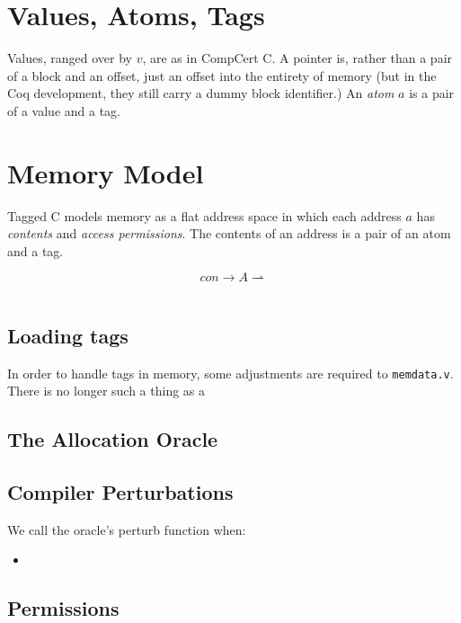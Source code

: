 \documentclass{article}
\begin{document}
\section{Values, Atoms, Tags}

Values, ranged over by \(v\), are as in CompCert C. A pointer is, rather than a pair of
a block and an offset, just an offset into the entirety of memory
(but in the Coq development, they still carry a dummy block identifier.)
An {\it atom} \(a\) is a pair of a value and a tag.

\section{Memory Model}

Tagged C models memory as a flat address space in which each address \(a\)
has {\it contents} and {\it access permissions}. The contents of an address
is a pair of an atom and a tag.

\[\mathit{con} \rightarrow A \rightharpoonup \]

\begin{tabular}{l l}
  
\end{tabular}

\subsection{Loading tags}

In order to handle tags in memory, some adjustments are required to {\tt memdata.v}.
There is no longer such a thing as a 

\subsection{The Allocation Oracle}

\subsection{Compiler Perturbations}

We call the oracle's perturb function when:
\begin{itemize}
\item 
\end{itemize}

\subsection{Permissions}
\end{document}
